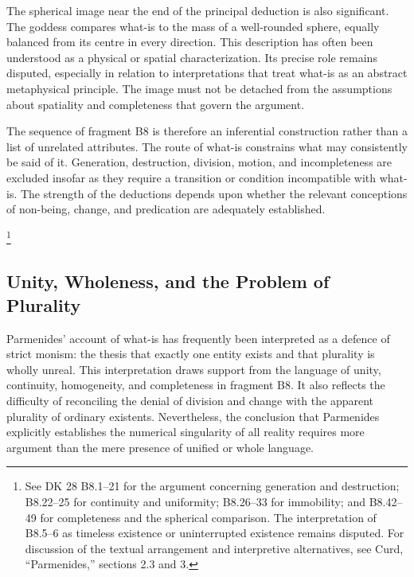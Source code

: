 
The spherical image near the end of the principal
deduction is also significant. The goddess compares
what-is to the mass of a well-rounded sphere, equally
balanced from its centre in every direction. This
description has often been understood as a physical
or spatial characterization. Its precise role remains
disputed, especially in relation to interpretations
that treat what-is as an abstract metaphysical
principle. The image must not be detached from
the assumptions about spatiality and completeness
that govern the argument.


The sequence of fragment B8 is therefore an
inferential construction rather than a list of
unrelated attributes. The route of what-is constrains
what may consistently be said of it. Generation,
destruction, division, motion, and incompleteness
are excluded insofar as they require a transition
or condition incompatible with what-is. The
strength of the deductions depends upon whether
the relevant conceptions of non-being, change,
and predication are adequately established.



\footnote{See DK 28 B8.1--21 for the argument concerning generation
and destruction; B8.22--25 for continuity and uniformity;
B8.26--33 for immobility; and B8.42--49 for completeness and
the spherical comparison. The interpretation of B8.5--6 as
timeless existence or uninterrupted existence remains disputed.
For discussion of the textual arrangement and interpretive
alternatives, see Curd, ``Parmenides,'' sections 2.3 and 3.}


\subsection{Unity, Wholeness, and the Problem of Plurality}


Parmenides' account of what-is has frequently been
interpreted as a defence of strict monism: the thesis
that exactly one entity exists and that plurality
is wholly unreal. This interpretation draws support
from the language of unity, continuity, homogeneity,
and completeness in fragment B8. It also reflects
the difficulty of reconciling the denial of division
and change with the apparent plurality of ordinary
existents. Nevertheless, the conclusion that
Parmenides explicitly establishes the numerical
singularity of all reality requires more argument
than the mere presence of unified or whole language.

